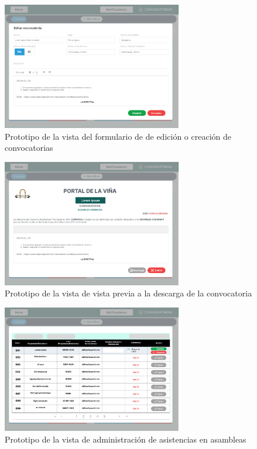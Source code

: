 \begin{figure}[H]
    \centering
    \includegraphics[width=0.7\textwidth]{resources/images/convocatorias_edit}
    \caption{Prototipo de la vista del formulario de de edición o creación de convocatorias}
    \label{fig:convocatorias-edit}
\end{figure}

\begin{figure}[H]
    \centering
    \includegraphics[width=0.7\textwidth]{resources/images/convocatorias_ver}
    \caption{Prototipo de la vista de vista previa a la descarga de la convocatoria}
    \label{fig:convocatorias-ver}
\end{figure}

\begin{figure}[H]
    \centering
    \includegraphics[width=0.7\textwidth]{resources/images/convocatorias_asistentes}
    \caption{Prototipo de la vista de administración de asistencias en asambleas}
    \label{fig:convocatorias-asistentes}
\end{figure}

